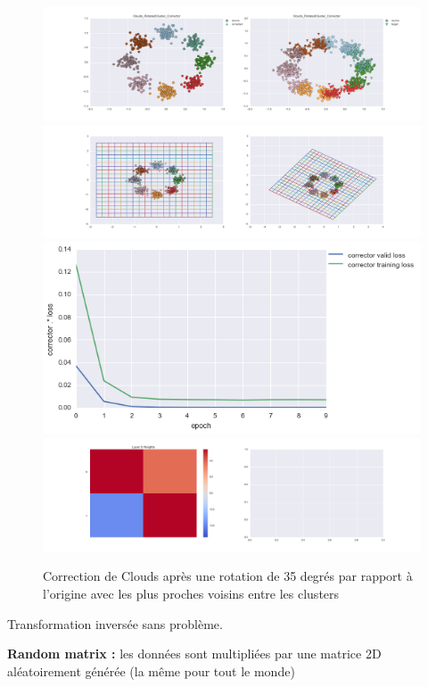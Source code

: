 \begin{figure}[H] %
\centering
\includegraphics[width=\linewidth]{fig/24-05-2016/clouds/Clouds_RotatedCluster_Corrector-DATA.png}
\includegraphics[width=\linewidth]{fig/24-05-2016/clouds/Clouds_RotatedCluster_Corrector-GridCheck.png}
\includegraphics[width=0.45\linewidth]{fig/24-05-2016/clouds/Clouds_RotatedCluster_Corrector-Learning_curve.png}
\includegraphics[width=\linewidth]{fig/24-05-2016/clouds/Clouds_RotatedCluster_Corrector-W.png}
\caption{Correction de Clouds après une rotation de 35 degrés par rapport à l'origine avec les plus proches voisins entre les clusters}
\label{fig:recap-clouds-rot-cluster}
\end{figure}

Transformation inversée sans problème.

{\Large \textbf{Random matrix :}} les données sont multipliées par une matrice 2D aléatoirement générée
 (la même pour tout le monde)

